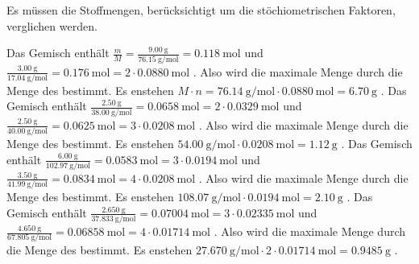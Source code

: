 \documentclass[DIV11,bib=totoc]{scrartcl}
\begin{document}
\begin{solution}
Es müssen die Stoffmengen, berücksichtigt um die stöchiometrischen Faktoren,
verglichen werden.
\begin{tasks}
  \task Das Gemisch enthält $\frac{m}{M} =
    \frac{\SI{9.00}{\gram}}{\SI{76.15}{\gram\per\mole}} = \SI{0.118}{\mole}$
     und $\frac{\SI{3.00}{\gram}}{\SI{17.04}{\gram\per\mole}} =
    \SI{0.176}{\mole} = 2\cdot\SI{0.0880}{\mole}$ .  Also wird die
    maximale Menge durch die Menge des  bestimmt.  Es enstehen $M\cdot
    n = \SI{76.14}{\gram\per\mole}\cdot\SI{0.0880}{\mole} = \SI{6.70}{\gram}$
    .
  \task Das Gemisch enthält
    $\frac{\SI{2.50}{\gram}}{\SI{38.00}{\gram\per\mole}} = \SI{0.0658}{\mole}
    = 2\cdot\SI{0.0329}{\mole}$  und
    $\frac{\SI{2.50}{\gram}}{\SI{40.00}{\gram\per\mole}} = \SI{0.0625}{\mole}
    = 3\cdot\SI{0.0208}{\mole}$ .  Also wird die maximale Menge durch
    die Menge des  bestimmt.  Es enstehen
    $\SI{54.00}{\gram\per\mole}\cdot\SI{0.0208}{\mole} = \SI{1.12}{\gram}$
    .
  \task Das Gemisch enthält
    $\frac{\SI{6.00}{\gram}}{\SI{102.97}{\gram\per\mole}} = \SI{0.0583}{\mole} =
    3\cdot\SI{0.0194}{\mole}$  und
    $\frac{\SI{3.50}{\gram}}{\SI{41.99}{\gram\per\mole}} = \SI{0.0834}{\mole}
    = 4\cdot\SI{0.0208}{\mole}$ .  Also wird die maximale Menge durch
    die Menge des  bestimmt.  Es enstehen
    $\SI{108.07}{\gram\per\mole}\cdot\SI{0.0194}{\mole} = \SI{2.10}{\gram}$
    .
  \task Das Gemisch enthält
    $\frac{\SI{2.650}{\gram}}{\SI{37.833}{\gram\per\mole}} =
    \SI{0.07004}{\mole} = 3\cdot\SI{0.02335}{\mole}$  und
    $\frac{\SI{4.650}{\gram}}{\SI{67.805}{\gram\per\mole}} =
    \SI{0.06858}{\mole} = 4\cdot\SI{0.01714}{\mole}$ .  Also wird die
    maximale Menge durch die Menge des  bestimmt.  Es enstehen
    $\SI{27.670}{\gram\per\mole}\cdot2\cdot\SI{0.01714}{\mole} =
    \SI{0.9485}{\gram}$ .
\end{tasks}
\end{solution}
\end{document}
